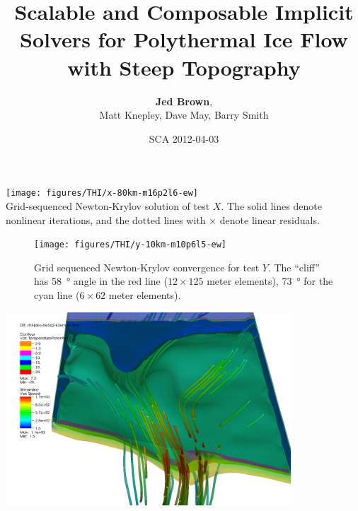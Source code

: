 \documentclass{beamer}
\title{Scalable and Composable Implicit Solvers for Polythermal Ice Flow with Steep Topography}
\author{{\bf Jed Brown}\inst{1},\\
Matt Knepley\inst{2}, Dave May\inst{3}, Barry Smith\inst{1}}
\institute
{
  \inst{1}{Mathematics and Computer Science Division, Argonne National Laboratory} \\
  \inst{2}{Computation Institute, University of Chicago} \\
  \inst{3}{ETH Z\"urich}
}
\date{SCA 2012-04-03}
\begin{document}
\lstset{language=C}
\normalem

\begin{frame}
  \titlepage
\end{frame}

%


\begin{frame}
  \texttt{[image: figures/THI/x-80km-m16p2l6-ew]} \\
  Grid-sequenced Newton-Krylov solution of test $X$.  The solid lines denote nonlinear iterations, and the dotted lines with $\times$ denote linear residuals.
\end{frame}

\begin{frame}
  \begin{figure}
    \texttt{[image: figures/THI/y-10km-m10p6l5-ew]}
    \centering\caption{Grid sequenced Newton-Krylov convergence for test $Y$.
    The ``cliff'' has \SI{58}{\degree} angle in the red line ($12\times 125$ meter elements), \SI{73}{\degree} for the cyan line ($6\times 62$ meter elements).}\label{fig:testy}
  \end{figure}
\end{frame}
\begin{frame}
  \includegraphics[width=0.8\textwidth]{figures/VHT/VHTJakoContourStream}
\end{frame}










%
\end{document}
